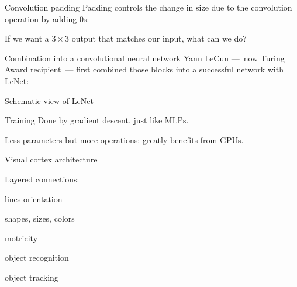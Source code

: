 \begin{frame}{Convolution padding}
  Padding controls the change in size due to the convolution operation by adding $0$s:


  If we want a $3 \times 3$ output that matches our input, what can we do?
\end{frame}

\begin{frame}{Combination into a convolutional neural network}
  Yann LeCun ---~now Turing Award recipient~--- first combined those blocks into a successful network with LeNet:

\end{frame}

\begin{frame}{Schematic view of LeNet}
\end{frame}

\begin{frame}{Training}
  Done by gradient descent, just like MLPs.

  Less parameters but more operations: greatly benefits from GPUs.

\end{frame}

\begin{frame}{Visual cortex architecture}
  \begin{minipage}[l]{0.50\linewidth}
  \end{minipage}\hfill
  \begin{minipage}[l]{0.49\linewidth}
    Layered connections:
    \begin{description}[<+(1)->]
    \item[V1] lines orientation
    \item[V2] shapes, sizes, colors
    \item[V3] motricity
    \item[V4] object recognition
    \item[V5] object tracking
    \end{description}
  \end{minipage}\hfill
\end{frame}
